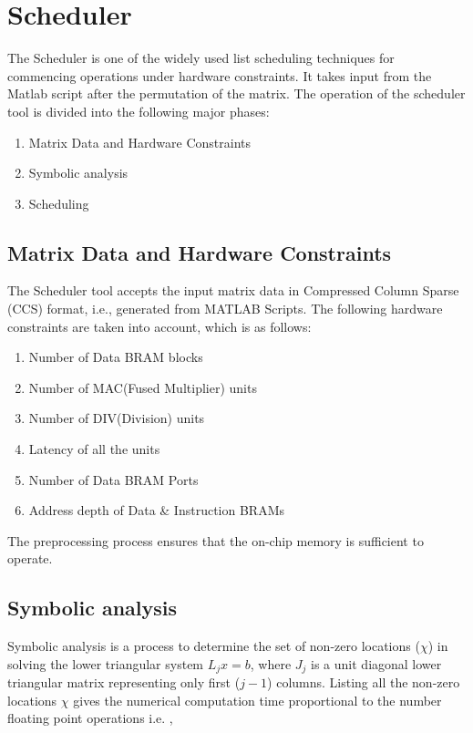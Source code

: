 \chapter{Scheduler}

The Scheduler is one of the widely used list scheduling techniques for commencing operations under hardware constraints. It takes input from the Matlab script after the permutation of the matrix. The operation of the scheduler tool is divided into the following major phases:
\begin{enumerate}
	\item Matrix Data and Hardware Constraints
	\item Symbolic analysis
	\item Scheduling 
\end{enumerate}

\section{Matrix Data and Hardware Constraints}
The Scheduler tool accepts the input matrix data in  Compressed Column Sparse (CCS) format, i.e., generated from MATLAB Scripts. The following hardware constraints are taken into account, which is as follows:
\begin{enumerate}
        \item Number of Data BRAM blocks
        \item Number of MAC(Fused Multiplier) units
        \item Number of DIV(Division) units
        \item Latency of all the units
        \item Number of Data BRAM Ports
        \item Address depth of Data \& Instruction BRAMs
\end{enumerate}
The preprocessing process ensures that the on-chip memory is sufficient to operate.

\section{Symbolic analysis}

Symbolic analysis is a process to determine the set of non-zero locations ($\chi$)
in solving the lower triangular system $L_j x = b$, where $J_j$ is a unit diagonal 
lower triangular matrix representing only first ($j-1$) columns. Listing all 
the non-zero locations \(\chi\) gives the numerical computation time proportional to
the number floating point operations i.e. ,



